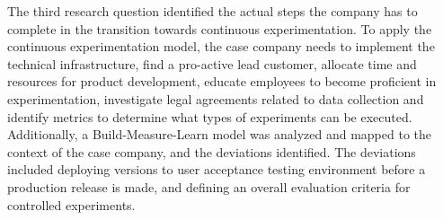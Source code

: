 \documentclass[english, grading]{tktltiki2}
\theoremstyle{definition}
\theoremstyle{remark}
\begin{document}
The third research question identified the actual steps the company has to complete in the transition towards continuous experimentation. To apply the continuous experimentation model, the case company needs to implement the technical infrastructure, find a pro-active lead customer, allocate time and resources for product development, educate employees to become proficient in experimentation, investigate legal agreements related to data collection and identify metrics to determine what types of experiments can be executed. Additionally, a Build-Measure-Learn model \cite{fagerholm2014building} was analyzed and mapped to the context of the case company, and the deviations identified. The deviations included deploying versions to user acceptance testing environment before a production release is made, and defining an overall evaluation criteria for controlled experiments. 















\end{document}

